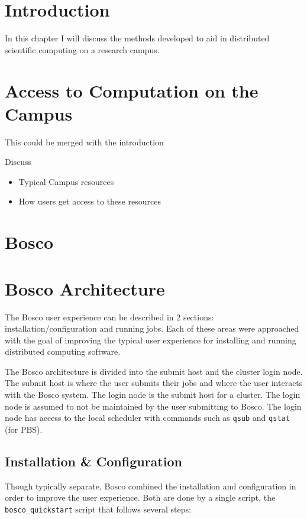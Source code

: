 \section{Introduction}

In this chapter I will discuss the methods developed to aid in distributed scientific computing on a research campus.  

\section{Access to Computation on the Campus}

This could be merged with the introduction

Discuss
\begin{itemize}
\item Typical Campus resources
\item How users get access to these resources
\end{itemize}

\section{Bosco}

\section{Bosco Architecture}
\label{sec:boscoarch}

% 

The Bosco user experience can be described in 2 sections: installation/configuration and running jobs.  Each of these areas were approached with the goal of improving the typical user experience for installing and running distributed computing software.

The Bosco architecture is divided into the submit host and the cluster login node.  The submit host is where the user submits their jobs and where the user interacts with the Bosco system.  The login node is the submit host for a cluster.  The login node is assumed to not be maintained by the user submitting to Bosco.  The login node has access to the local scheduler with commands such as \texttt{qsub} and \texttt{qstat} (for PBS).  

\subsection{Installation \& Configuration}
Though typically separate, Bosco combined the installation and configuration in order to improve the user experience.  Both are done by a single script, the \texttt{bosco\_quickstart} script that follows several steps:

